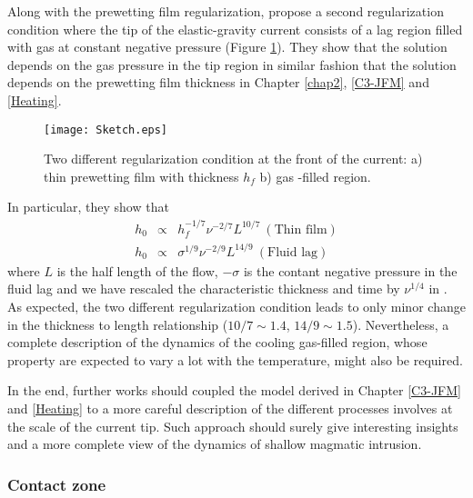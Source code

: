 Along      with      the     prewetting      film      regularization,
\citet{Anonymous:QWXp_4JV} propose  a second  regularization condition
where the tip of the elastic-gravity  current consists of a lag region
filled   with    gas   at    constant   negative    pressure   (Figure
\ref{C7-Sketch}).   They show  that the  solution depends  on the  gas
pressure  in the  tip  region  in similar  fashion  that the  solution
depends  on  the prewetting  film  thickness  in Chapter  \ref{chap2},
\ref{C3-JFM} and \ref{Heating}.
\begin{figure}[htpb]
  \begin{center}
    \graphicspath{ {/Users/thorey/Documents/These/Manuscript/Figure/Chapter7/} }
    \texttt{[image: Sketch.eps]}
    \caption{Two different  regularization condition  at the  front of
      the current: a) thin prewetting film with thickness $h_f$ b) gas
      -filled region.}
    \label{C7-Sketch}
  \end{center}
\end{figure}
In particular, they show that
\begin{eqnarray}
  h_0&\propto& h_f^{-1/7}\nu^{-2/7}L^{10/7}~(\text{Thin film})\\
  h_0&\propto& \sigma^{1/9}\nu^{-2/9}L^{14/9}~(\text{Fluid lag})
\end{eqnarray}
where $L$  is the half  length of the  flow, $-\sigma$ is  the contant
negative  pressure  in  the  fluid   lag  and  we  have  rescaled  the
characteristic    thickness    and     time    by    $\nu^{1/4}$    in
\citet{Anonymous:QWXp_4JV}.    As   expected,    the   two   different
regularization condition leads  to only minor change  in the thickness
to   length   relationship   ($10/7\sim  1.4$,   $14/9\sim   1.5   $).
Nevertheless, a  complete description of  the dynamics of  the cooling
gas-filled region, whose property are expected  to vary a lot with the
temperature, might also be required.

In the end, further works should  coupled the model derived in Chapter
\ref{C3-JFM} and  \ref{Heating} to a  more careful description  of the
different processes  involves at  the scale of  the current  tip. Such
approach should surely  give interesting insights and  a more complete
view of the dynamics of shallow magmatic intrusion.

\subsubsection*{Contact zone}
\label{sec:caref-descr-tip}

